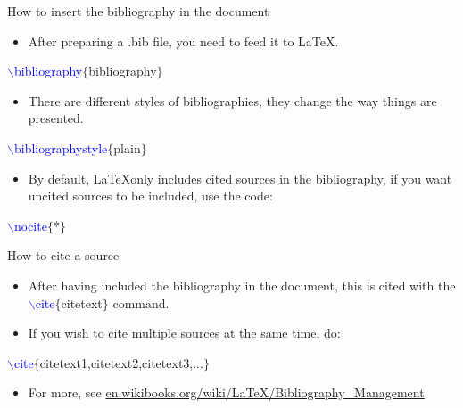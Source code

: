 \documentclass[usenames,dvipsnames,aspectratio=169]{beamer}
\newcommand{\aitem}{\item[$\cdot$]}
\begin{document}

\begin{frame}[t]{How to insert the bibliography in the document}
\begin{itemize}
\aitem After preparing a .bib file, you need to feed it to \LaTeX.
\end{itemize}
\textcolor{blue}{$\backslash$bibliography}\textcolor{PineGreen}{$\{$bibliography$\}$}
\begin{itemize}
\aitem There are different styles of bibliographies, they change the way things are presented.
\end{itemize}
\textcolor{blue}{$\backslash$bibliographystyle}\textcolor{PineGreen}{$\{$plain$\}$}
\begin{itemize}
\aitem By default, \LaTeX only includes cited sources in the bibliography, if you want uncited sources to be included, use the code:
\end{itemize}
\textcolor{blue}{$\backslash$nocite}\textcolor{PineGreen}{$\{$*$\}$}
\end{frame}


\begin{frame}[t]{How to cite a source}
\begin{itemize}
\aitem After having included the bibliography in the document, this is cited with the \textcolor{blue}{$\backslash$cite}\textcolor{PineGreen}{$\{$citetext$\}$} command.
\aitem If you wish to cite multiple sources at the same time, do:
\end{itemize}
\textcolor{blue}{$\backslash$cite}\textcolor{PineGreen}{$\{$citetext1,citetext2,citetext3,...$\}$}
\begin{itemize}
\aitem For more, see \textcolor{blue}{\url{en.wikibooks.org/wiki/LaTeX/Bibliography\_Management}}
\end{itemize}
\end{frame}

\end{document}
